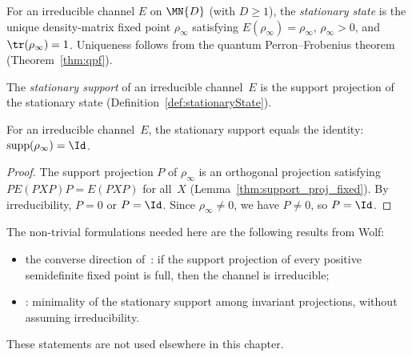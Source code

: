 \begin{definition}\label{def:stationaryState}
    \leanok
    For an irreducible channel $E$ on $\MN{D}$ (with $D \ge 1$),
    the \emph{stationary state} is the unique density-matrix fixed
    point $\rho_\infty$ satisfying $E(\rho_\infty) = \rho_\infty$,
    $\rho_\infty > 0$, and $\tr(\rho_\infty) = 1$.
    Uniqueness follows from the quantum Perron--Frobenius theorem
    (Theorem~\ref{thm:qpf}).
\end{definition}

\begin{definition}\label{def:stationarySupport}
    \leanok
    The \emph{stationary support} of an irreducible channel~$E$
    is the support projection of the stationary state
    (Definition~\ref{def:stationaryState}).
\end{definition}

\begin{theorem}%
    \label{thm:stationarySupport_eq_one}
    \leanok
    For an irreducible channel~$E$, the stationary support equals
    the identity: $\mathrm{supp}(\rho_\infty) = \Id$.
\end{theorem}

\begin{proof}
    \leanok
    The support projection $P$ of $\rho_\infty$ is an orthogonal
    projection satisfying $P E(PXP) P = E(PXP)$ for all~$X$
    (Lemma~\ref{thm:support_proj_fixed}).
    By irreducibility, $P = 0$ or $P = \Id$.
    Since $\rho_\infty \neq 0$, we have $P \neq 0$, so $P = \Id$.
\end{proof}

\begin{remark}%
    \label{rem:stationary_support_todo}
    The non-trivial formulations needed here are the following results from
    Wolf:
    \begin{itemize}
        \item the converse direction of~\cite[Proposition~6.10]{Wolf2012Quantum}:
              if the support projection of every positive semidefinite fixed point
              is full, then the channel is irreducible;
        \item \cite[Proposition~6.11]{Wolf2012Quantum}: minimality of the
              stationary support among invariant projections, without assuming
              irreducibility.
    \end{itemize}
    These statements are not used elsewhere in this chapter.
\end{remark}


